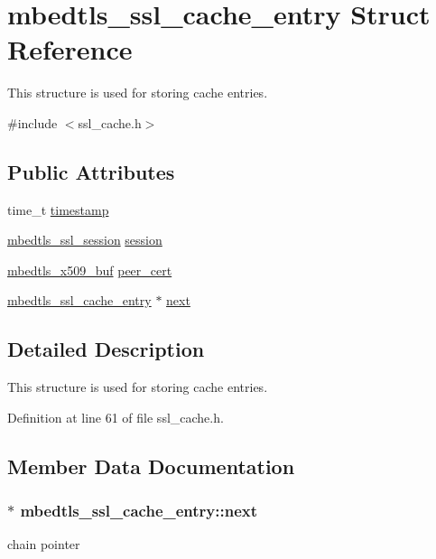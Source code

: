 \hypertarget{structmbedtls__ssl__cache__entry}{\section{mbedtls\-\_\-ssl\-\_\-cache\-\_\-entry Struct Reference}
\label{structmbedtls__ssl__cache__entry}
}


This structure is used for storing cache entries.  




{\ttfamily \#include $<$ssl\-\_\-cache.\-h$>$}

\subsection*{Public Attributes}
\begin{DoxyCompactItemize}
\item 
time\-\_\-t \hyperlink{structmbedtls__ssl__cache__entry_a20ad0e16bcfb45eadfb821bff0301ec3}{timestamp}
\item 
\hyperlink{structmbedtls__ssl__session}{mbedtls\-\_\-ssl\-\_\-session} \hyperlink{structmbedtls__ssl__cache__entry_ade27f016c0924422c5ba5e68650744bc}{session}
\item 
\hyperlink{group__x509__module_ga4d02c9e8e4e2934555e0d132cd2976dc}{mbedtls\-\_\-x509\-\_\-buf} \hyperlink{structmbedtls__ssl__cache__entry_aaa3550f088fef5e3e2ea793076d77a86}{peer\-\_\-cert}
\item 
\hyperlink{structmbedtls__ssl__cache__entry}{mbedtls\-\_\-ssl\-\_\-cache\-\_\-entry} $\ast$ \hyperlink{structmbedtls__ssl__cache__entry_a83fee0c73af53bc816d6a5f2ac795481}{next}
\end{DoxyCompactItemize}


\subsection{Detailed Description}
This structure is used for storing cache entries. 

Definition at line 61 of file ssl\-\_\-cache.\-h.



\subsection{Member Data Documentation}
\hypertarget{structmbedtls__ssl__cache__entry_a83fee0c73af53bc816d6a5f2ac795481}{
\subsubsection[{next}]{$\ast$ mbedtls\-\_\-ssl\-\_\-cache\-\_\-entry\-::next}}\label{structmbedtls__ssl__cache__entry_a83fee0c73af53bc816d6a5f2ac795481}
chain pointer 

